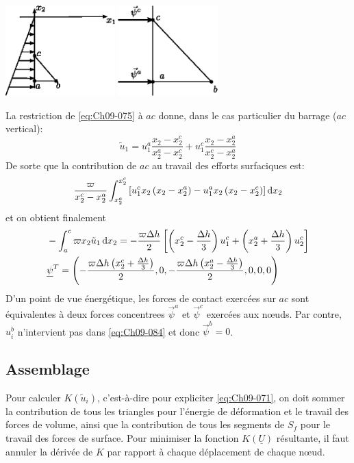     \begin{center}
        \includegraphics[height=3.5cm]{../images/T1_Ch09-10}
    \qquad
        \includegraphics[height=3.5cm]{../images/T1_Ch09-11}
    \end{center}

La restriction de \eqref{eq:Ch09-075} à $ac$ donne, dans le cas particulier du barrage ($ac$ vertical):
\begin{equation}
    \tilde{u}_1 = u_1^a \frac{x_2 - x_2^c}{x_2^a -x_2^c} + u_1^c \frac{x_2 - x_2^a}{x_2^c -x_2^a}
    \label{eq:Ch09-084}
\end{equation}
De sorte que la contribution de $ac$ au travail des efforts surfaciques est: 
\[
\frac{\varpi}{x_2^c -x_2^a} \int_{x_2^a}^{x_2^c} \left[ u_1^c x_2 \left( x_2 - x_2^a \right) - u_1^a x_2 \left( x_2 - x_2^c \right) \right] \mathop{\mathrm{{}d}}\mathopen{} x_2
\]
et on obtient finalement
\begin{align}
&    - \int_{a}^c \varpi x_2 \tilde{u}_1 \mathop{\mathrm{{}d}}\mathopen{} x_2 = - \frac{\varpi \Delta h}{2} \left[ \left( x_2^c - \frac{\Delta h}{3} \right) u_1^c + \left( x_2^a + \frac{\Delta h}{3} \right) u_2^c \right]
    \label{eq:Ch09-085}\\
&    \underline{\psi}^T = \left( - \frac{\varpi \Delta h \left( x_2^c + \frac{\Delta h}{3} \right)}{2}, 0, - \frac{\varpi \Delta h \left( x_2^a - \frac{\Delta h}{3} \right)}{2}, 0, 0, 0 \right)
    \label{eq:Ch09-086}
\end{align}
D'un point de vue énergétique, les forces de contact exercées sur $ac$ sont équivalentes à deux forces concentrees  $\vec{\psi}^a$ et $\vec{\psi}^c$ exercées aux nœuds.
Par contre, $u_i^b$ n'intervient pas dans \eqref{eq:Ch09-084} et donc $\vec{\psi}^b=0$.
\subsection{Assemblage} \label{ssec:Ch09-3.4}
Pour calculer $K \left( \tilde{u}_i \right)$, c'est-à-dire pour expliciter \eqref{eq:Ch09-071}, on doit sommer la contribution de tous les triangles pour l'énergie de déformation et le travail des forces de volume, ainsi que la contribution de tous les segments de $S_f$ pour le travail des forces de surface.
Pour minimiser la fonction $K\left( \underline{U} \right)$ résultante, il faut annuler la dérivée de $K$ par rapport à chaque déplacement de chaque nœud. 
